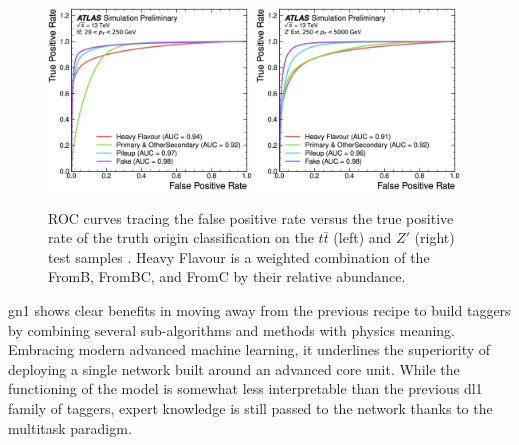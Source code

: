 \begin{figure}[h!]
  \centering
  \includegraphics[width=0.48\textwidth]{Images/FTAG/GN/GN1/ablations/ttroc.png}
  \includegraphics[width=0.48\textwidth]{Images/FTAG/GN/GN1/ablations/zproc.png}
  \caption{ROC curves tracing the false positive rate versus the true positive rate of the truth origin classification on the $t\bar{t}$ (left) and $Z'$ (right) test samples \cite{ATL-PHYS-PUB-2022-027}. Heavy Flavour is a weighted combination of the FromB, FromBC, and FromC by their relative abundance.}
  \label{fig:GN1trackperf}
\end{figure} 

\gls{gn1} shows clear benefits in moving away from the previous recipe to build taggers by combining several sub-algorithms and methods with physics meaning. Embracing modern advanced machine learning, it underlines the superiority of deploying a single network built around an advanced core unit. While the functioning of the model is somewhat less interpretable than the previous \gls{dl1} family of taggers, expert knowledge is still passed to the network thanks to the multitask paradigm. %

